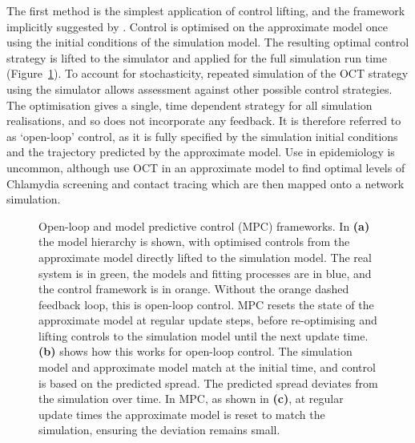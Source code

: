 The first method is the simplest application of control lifting, and the framework implicitly suggested by \citet{an_optimization_2017}. Control is optimised on the approximate model once using the initial conditions of the simulation model. The resulting optimal control strategy is lifted to the simulator and applied for the full simulation run time (Figure~\ref{fig:ch4:mpc_framework}). To account for stochasticity, repeated simulation of the OCT strategy using the simulator allows assessment against other possible control strategies. The optimisation gives a single, time dependent strategy for all simulation realisations, and so does not incorporate any feedback. It is therefore referred to as `open-loop' control, as it is fully specified by the simulation initial conditions and the trajectory predicted by the approximate model. Use in epidemiology is uncommon, although \citet{clarke_approximating_2013} use OCT in an approximate model to find optimal levels of Chlamydia screening and contact tracing which are then mapped onto a network simulation.

\begin{figure}
    \begin{center}
        \hspace{0em}
        \hspace{0em}

        \caption[Open-loop and model predictive control frameworks]{Open-loop and model predictive control (MPC) frameworks. In \textbf{(a)} the model hierarchy is shown, with optimised controls from the approximate model directly lifted to the simulation model. The real system is in green, the models and fitting processes are in blue, and the control framework is in orange. Without the orange dashed feedback loop, this is open-loop control. MPC resets the state of the approximate model at regular update steps, before re-optimising and lifting controls to the simulation model until the next update time. \textbf{(b)} shows how this works for open-loop control. The simulation model and approximate model match at the initial time, and control is based on the predicted spread. The predicted spread deviates from the simulation over time. In MPC, as shown in \textbf{(c)}, at regular update times the approximate model is reset to match the simulation, ensuring the deviation remains small.
        \label{fig:ch4:mpc_framework}}
    \end{center}
\end{figure}

